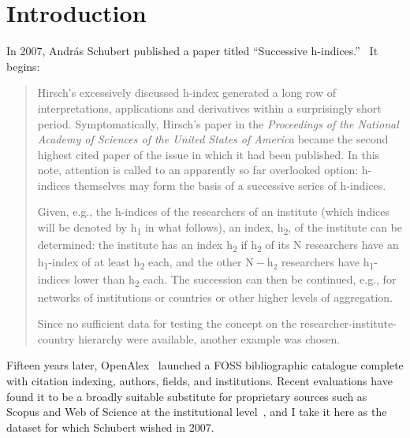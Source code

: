 \section{Introduction}
\label{sec:intro}
In 2007, András Schubert published a paper titled ``Successive h-indices.''~\citeyearpar{parent} It begins:
\begin{quotation}
	Hirsch's excessively discussed h-index generated a long row of interpretations, applications and derivatives within a surprisingly short period. Symptomatically, Hirsch's paper in the \textit{Proceedings of the National Academy of Sciences of the United States of America} became the second highest cited paper of the issue in which it had been published. In this note, attention is called to an apparently so far overlooked option: h-indices themselves may form the basis of a successive series of h-indices.

	Given, e.g., the h-indices of the researchers of an institute (which indices will be denoted by h\textsubscript{1} in what follows), an index, h\textsubscript{2}, of the institute can be determined: the institute has an index h\textsubscript{2} if h\textsubscript{2} of its N researchers have an h\textsubscript{1}-index of at least h\textsubscript{2} each, and the other $\mathrm{N}-\mathrm{h}_2$ researchers have h\textsubscript{1}-indices lower than h\textsubscript{2} each. The succession can then be continued, e.g., for networks of institutions or countries or other higher levels of aggregation.

	Since no sufficient data for testing the concept on the researcher-institute-country hierarchy were available, another example was chosen.
\end{quotation}

Fifteen years later, OpenAlex~\citep{openalex} launched a FOSS bibliographic catalogue complete with citation indexing, authors, fields, and institutions. Recent evaluations have found it to be a broadly suitable substitute for proprietary sources such as Scopus and Web of Science at the institutional level~\citep{alperin2024,culbert2025}, and I take it here as the dataset for which Schubert wished in 2007.

